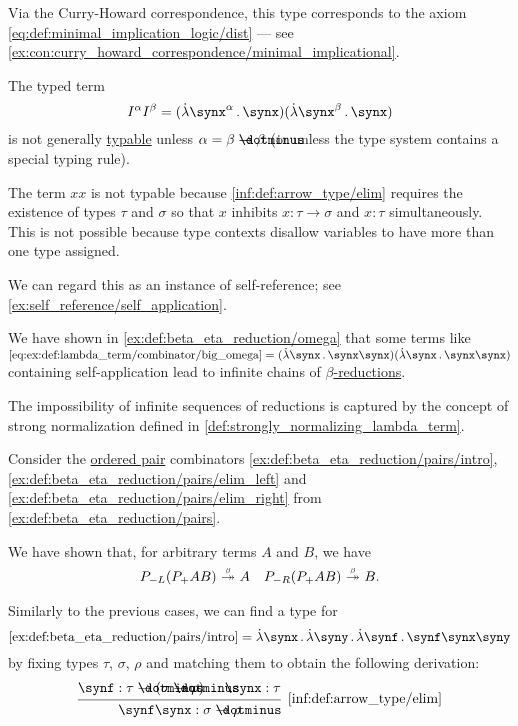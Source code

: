 \begin{example}
\begin{thmenum}
    Via the Curry-Howard correspondence, this type corresponds to the axiom \eqref{eq:def:minimal_implication_logic/dist} --- see \cref{ex:con:curry_howard_correspondence/minimal_implicational}.

     The typed term
    \begin{equation*}
      I^\alpha I^\beta = (\qabs {\synx^\alpha} \synx) (\qabs {\synx^\beta} \synx)
    \end{equation*}
    is not generally \hyperref[def:typability]{typable} unless \( \alpha = \beta \synimplies \beta \) (or unless the type system contains a special typing rule).

     The term \( xx \) is not typable because \ref{inf:def:arrow_type/elim} requires the existence of types \( \tau \) and \( \sigma \) so that \( x \) inhibits \( x: \tau \to \sigma \) and \( x: \tau \) simultaneously. This is not possible because type contexts disallow variables to have more than one type assigned.

    We can regard this as an instance of self-reference; see \cref{ex:self_reference/self_application}.

    We have shown in \cref{ex:def:beta_eta_reduction/omega} that some terms like \( \ref{eq:ex:def:lambda_term/combinator/big_omega} = (\qabs \synx \synx \synx) (\qabs \synx \synx \synx) \) containing self-application lead to infinite chains of \hyperref[def:beta_eta_reduction]{\( \beta \)-reductions}.

    The impossibility of infinite sequences of reductions is captured by the concept of strong normalization defined in \cref{def:strongly_normalizing_lambda_term}.

     Consider the \hyperref[def:ordered_tuple]{ordered pair} combinators \ref{ex:def:beta_eta_reduction/pairs/intro}, \ref{ex:def:beta_eta_reduction/pairs/elim_left} and \ref{ex:def:beta_eta_reduction/pairs/elim_right} from \cref{ex:def:beta_eta_reduction/pairs}.

    We have shown that, for arbitrary terms \( A \) and \( B \), we have
    \begin{align*}
      P_{-L} (P_+ A B) \bred* A
      &&
      P_{-R} (P_+ A B) \bred* B.
    \end{align*}

    Similarly to the previous cases, we can find a type for
    \begin{equation*}
      \ref{ex:def:beta_eta_reduction/pairs/intro} = \qabs \synx \qabs \syny \qabs \synf \synf \synx \syny
    \end{equation*}
    by fixing types \( \tau \), \( \sigma \), \( \rho \) and matching them to obtain the following derivation:
    \begin{equation*}
      \begin{prooftree}
        \hypo{ \synf: \tau \synimplies (\sigma \synimplies \rho) }
        \hypo{ \synx: \tau }
        \infer2[\ref{inf:def:arrow_type/elim}]{ \synf \synx: \sigma \synimplies \rho }


\end{prooftree}
\end{equation*}
\end{thmenum}
\end{example}
